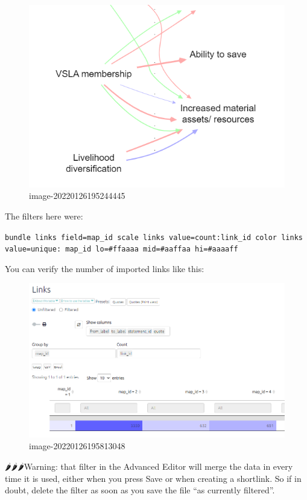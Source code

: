 \documentclass[
]{book}
\begin{document}
\begin{enumerate}
  \begin{figure}
  \centering
  \includegraphics{_assets/image-20220126195244445.png}
  \caption{image-20220126195244445}
  \end{figure}

  The filters here were:

  \texttt{bundle\ links\ field=map\_id\ scale\ links\ value=count:link\_id\ color\ links\ value=unique:\ map\_id\ lo=\#ffaaaa\ mid=\#aaffaa\ hi=\#aaaaff}
\end{enumerate}

You can verify the number of imported links like this:

\begin{figure}
\centering
\includegraphics{_assets/image-20220126195813048.png}
\caption{image-20220126195813048}
\end{figure}

🌶️🌶️🌶️Warning: that filter in the Advanced Editor will merge the data in every time it is used, either when you press Save or when creating a shortlink. So if in doubt, delete the filter as soon as you save the file ``as currently filtered''.
\end{document}
